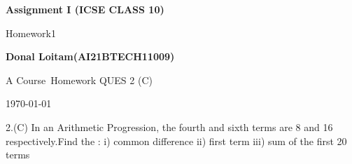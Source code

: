 \documentclass[10pt, a4paper]{article}
\newcommand\course{Course}                      %
\newcommand\hwnumber{1}                         %
\begin{document}
\begin{titlepage}
    \begin{center}
        \vspace*{3cm}
            
        \Huge
        \textbf{Assignment I (ICSE CLASS 10)}
            
        \vspace{1cm}
        \huge
        Homework\hwnumber
            
        \vspace{1.5cm}
        \Large
            
        \textbf{Donal Loitam(AI21BTECH11009)}                     
        
            
        \vfill
        
        A \course \ Homework QUES 2 (C)
            
        \vspace{1cm}
            
       
       
        
        \Large
        
        \today
            
    \end{center}
\end{titlepage}


\newpage
\begin{Problem}
\large 2.(C) In an Arithmetic Progression, the fourth and sixth terms are 8 and 16 respectively.Find the :
 i) common difference
 ii) first term
 iii) sum of the first 20 terms
\end{Problem}
    
\end{document}

